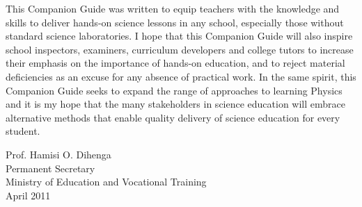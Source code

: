 This Companion Guide was written to equip teachers with the knowledge and skills to deliver hands-on science lessons in any school, especially those without standard science laboratories. I hope that this Companion Guide will also inspire school inspectors, examiners, curriculum developers and college tutors to increase their emphasis on the importance of hands-on education, and to reject material deficiencies as an excuse for any absence of practical work. In the same spirit, this Companion Guide seeks to expand the range of approaches to learning Physics and it is my hope that the many stakeholders in science education will embrace alternative methods that enable quality delivery of science education for every student.\\[40pt]
\begin{figure}[h!]
\def\svgwidth{200pt}

\end{figure}
\vspace{-20pt}
\begin{flushleft}
Prof. Hamisi O. Dihenga\\
Permanent Secretary\\
Ministry of Education and Vocational Training\\
April 2011
\end{flushleft}